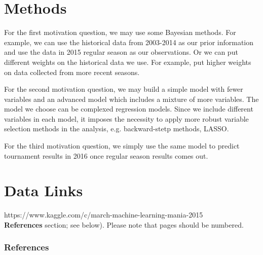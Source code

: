 \documentclass{article} %
\begin{document}


\section{Methods}
\label{gen_inst}

For the first motivation question, we may use some Bayesian methods. For example, we can use the historical data from 2003-2014 as our prior information and use the data in 2015 regular season as our observations. Or we can put different weights on the historical data we use. For example, put higher weights on data collected from more recent seasons.

For the second motivation question, we may build a simple model with fewer variables and an advanced model which includes a mixture of more variables. The model we choose can be complexed regression models. Since we include different variables in each model, it imposes the necessity to apply more robust variable selection methods in the analysis, e.g. backward-stetp methods, LASSO.    

For the third motivation question, we simply use the same model to predict tournament results in 2016 once regular season results comes out. 

\section{Data Links}
 https://www.kaggle.com/c/march-machine-learning-mania-2015\\
\textbf{References} section; see below). Please note that pages should be
numbered.

\subsubsection*{References}
\end{document}
